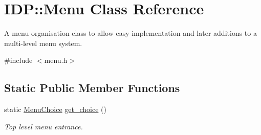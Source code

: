 \hypertarget{classIDP_1_1Menu}{
\section{IDP::Menu Class Reference}
\label{classIDP_1_1Menu}
}


A menu organisation class to allow easy implementation and later additions to a multi-\/level menu system.  




{\ttfamily \#include $<$menu.h$>$}

\subsection*{Static Public Member Functions}
\begin{DoxyCompactItemize}
\item 
static \hyperlink{namespaceIDP_ac1d3c3b62448912be4da9f2728f2af99}{MenuChoice} \hyperlink{classIDP_1_1Menu_a5a2affbb79c5c58bcf92fabe7875a07e}{get\_\-choice} ()
\begin{DoxyCompactList}\small\item\em Top level menu entrance. \item\end{DoxyCompactList}\end{DoxyCompactItemize}
